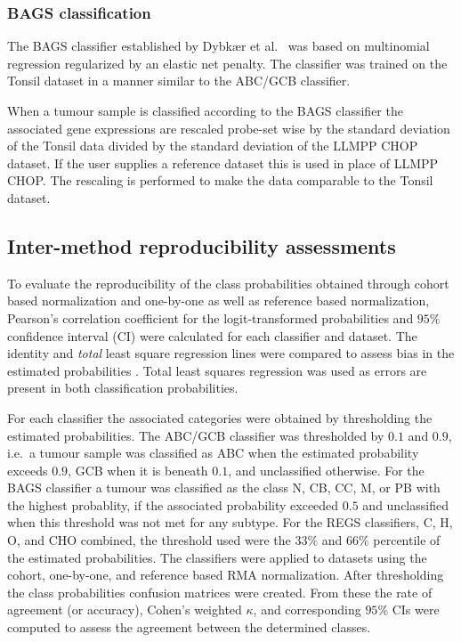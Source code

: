 \documentclass[twocolumn]{bmcart}%
\begin{document}
\subsubsection{BAGS classification}
The BAGS classifier established by Dybk{\ae}r et al.~\cite{DybkaerBoegsted2015} was based on multinomial regression regularized by an elastic net penalty.
The classifier was trained on the Tonsil dataset in a manner similar to the ABC/GCB classifier.

When a tumour sample is classified according to the BAGS classifier the associated gene expressions are rescaled probe-set wise by the standard deviation of the Tonsil data divided by the standard deviation of the LLMPP CHOP dataset.
If the user supplies a reference dataset this is used in place of LLMPP CHOP.
The rescaling is performed to make the data comparable to the Tonsil dataset.



\subsection{Inter-method reproducibility assessments}
To evaluate the reproducibility of the class probabilities obtained through cohort based normalization and one-by-one as well as reference based normalization, Pearson's correlation coefficient for the logit-transformed probabilities and $95\%$ confidence interval (CI) were calculated for each classifier and dataset.
The identity and \emph{total} least square regression lines were compared to assess bias in the estimated probabilities \cite{CHEN1989}.
Total least squares regression was used as errors are present in both classification probabilities.

For each classifier the associated categories were obtained by thresholding the estimated probabilities.
The ABC/GCB classifier was thresholded by $0.1$ and $0.9$, i.e.\ a tumour sample was classified as ABC when the estimated probability exceeds $0.9$, GCB when it is beneath $0.1$, and unclassified otherwise.
For the BAGS classifier a tumour was classified as the class N, CB, CC, M, or PB with the highest probablity, if the associated probability exceeded $0.5$ and unclassified when this threshold was not met for any subtype.
For the REGS classifiers, C, H, O, and CHO combined, the threshold used were the $33\%$ and $66\%$ percentile of the estimated probabilities.
The classifiers were applied to datasets using the cohort, one-by-one, and reference based RMA normalization.
After thresholding the class probabilities confusion matrices were created.
From these the rate of agreement (or accuracy), Cohen's weighted $\kappa$, and corresponding $95\%$ CIs were computed to assess the agreement between the determined classes.
\end{document}
